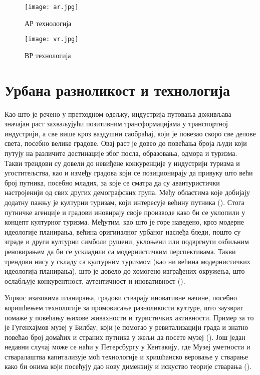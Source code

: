 \documentclass{article}
\begin{document}
\begin{figure}[H]
\centering
\texttt{[image: ar.jpg]}
\caption{АР технологија}
\end{figure}

\begin{figure}[H]
\centering
\texttt{[image: vr.jpg]}
\caption{ВР технологија}
\end{figure}

\section{Урбана разноликост и технологија}

Као што је речено у претходном одељку, индустрија путовања доживљава значајан раст захваљујући позитивним трансформацијама у транспортној индустрији, а све више кроз ваздушни саобраћај, који је повезао скоро све делове света, посебно велике градове. Овај раст је довео до повећања броја људи који путују на различите дестинације због посла, образовања, одмора и туризма. Такви трендови су довели до невиђене конкуренције у индустрији туризма и угоститељства, као и између градова који се позиционирају да привуку што већи број путника, посебно младих, за које се сматра да су авантуристички настројенији од свих других демографских група. Међу областима које добијају додатну пажњу је културни туризам, који интересује већину путника (\cite{richardsg}). Стога путничке агенције и градови иновирају своје производе како би се уклопили у концепт културног туризма. Међутим, као што је горе наведено, кроз модерне идеологије планирања, већина оригиналног урбаног наслеђа бледи, пошто су зграде и други културни симболи рушени, уклоњени или подвргнути озбиљним реновирањем да би се ускладили са модернистичким перспективама. Такви трендови нису у складу са културним туризмом (као ни већина модернистичких идеологија планирања), што је довело до хомогено изграђених окружења, што ослабљује конкурентност, аутентичност и иновативност (\cite{appendino}).

Упркос изазовима планирања, градови стварају иновативне начине, посебно коришћењем технологије за промовисање разноликости културе, што заузврат помаже у повећању њихове живахности и туристичких активности. Пример за то је Гугенхајмов музеј у Билбау, који је помогао у ревитализацији града и знатно повећао број домаћих и страних путника у жељи да посете музеј (\cite{plazab}). Још један недавни случај може се наћи у Петерсбургу у Кентакију, где Музеј уметности и стваралаштва капитализује моћ технологије и хришћанско веровање у стварање како би онима који посећују дао нову димензију и искуство теорије стварања (\cite{hamk}).
\end{document}
